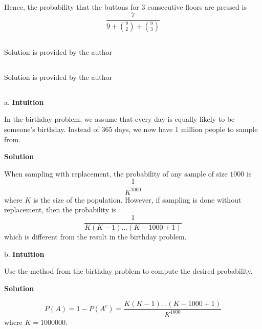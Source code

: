 \documentclass[]{book}
\begin{document}
Hence, the probability that the buttons for \(3\) consecutive floors are
pressed is \[\frac{7}{9 + {9 \choose 2} + {9 \choose 3}}\]

\subsection{}\label{section-23}

Solution is provided by the author

\subsection{}\label{section-24}

Solution is provided by the author

\subsection{}\label{section-25}

a. \textbf{Intuition}

In the birthday problem, we assume that every day is equally likely to
be someone's birthday. Instead of \(365\) days, we now have \(1\)
million people to sample from.

 \textbf{Solution}

When sampling with replacement, the probability of any sample of size
\(1000\) is \[\frac{1}{K^{1000}}\] where \(K\) is the size of the
population. However, if sampling is done without replacement, then the
probability is \[\frac{1}{K(K-1) \dots (K-1000+1)}\] which is different
from the result in the birthday problem.

b. \textbf{Intuition}

Use the method from the birthday problem to compute the desired
probability.

 \textbf{Solution}

\[P(A) = 1 - P(A^{c}) = \frac{K(K-1) \dots (K-1000+1)}{K^{1000}}\] where
\(K = 1000000\).


\end{document}
